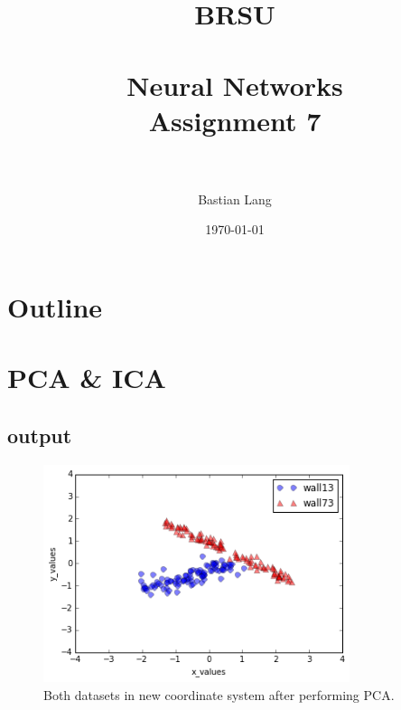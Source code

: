 \documentclass[paper=a4, fontsize=11pt]{scrartcl} %
\title{	
\normalfont \normalsize 
\textsc{BRSU} \\ [25pt] %
\horrule{0.5pt} \\[0.4cm] %
\huge Neural Networks\\Assignment 7 \\ %
\horrule{2pt} \\[0.5cm] %
}
\author{Bastian Lang} %
\date{\normalsize\today} %
\numberwithin{equation}{section} %
\numberwithin{figure}{section} %
\numberwithin{table}{section} %
\begin{document}
\maketitle %

\newpage

\section{Outline}

\section{PCA \& ICA}

\subsection{output}
\begin{figure}[ht]
	\centering
  \includegraphics[width=0.8\textwidth]{combined.png}
	\caption{Both datasets in new coordinate system after performing PCA.}
	\label{fig1}
\end{figure}
\end{document}
